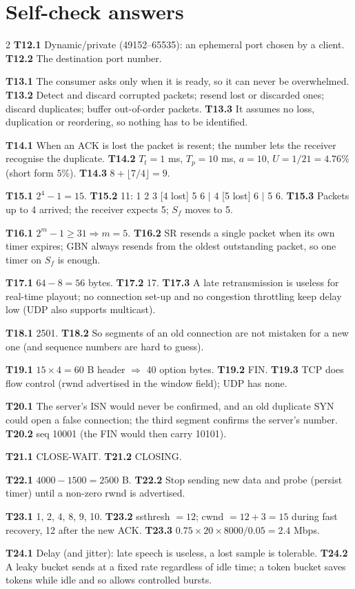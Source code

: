 \section*{Self-check answers}
\begin{multicols}{2}\footnotesize
\textbf{T12.1} Dynamic/private (49152--65535): an ephemeral port chosen by a client. \textbf{T12.2} The destination port number.

\textbf{T13.1} The consumer asks only when it is ready, so it can never be overwhelmed. \textbf{T13.2} Detect and discard corrupted packets; resend lost or discarded ones; discard duplicates; buffer out-of-order packets. \textbf{T13.3} It assumes no loss, duplication or reordering, so nothing has to be identified.

\textbf{T14.1} When an ACK is lost the packet is resent; the number lets the receiver recognise the duplicate. \textbf{T14.2} $T_t=1$ ms, $T_p=10$ ms, $a=10$, $U=1/21=4.76\%$ (short form 5\%). \textbf{T14.3} $8+\lfloor7/4\rfloor=9$.

\textbf{T15.1} $2^4-1=15$. \textbf{T15.2} 11: 1 2 3 [4 lost] 5 6 $|$ 4 [5 lost] 6 $|$ 5 6. \textbf{T15.3} Packets up to 4 arrived; the receiver expects 5; $S_f$ moves to 5.

\textbf{T16.1} $2^m-1\ge31\Rightarrow m=5$. \textbf{T16.2} SR resends a single packet when its own timer expires; GBN always resends from the oldest outstanding packet, so one timer on $S_f$ is enough.

\textbf{T17.1} $64-8=56$ bytes. \textbf{T17.2} 17. \textbf{T17.3} A late retransmission is useless for real-time playout; no connection set-up and no congestion throttling keep delay low (UDP also supports multicast).

\textbf{T18.1} 2501. \textbf{T18.2} So segments of an old connection are not mistaken for a new one (and sequence numbers are hard to guess).

\textbf{T19.1} $15\times4=60$ B header $\Rightarrow$ 40 option bytes. \textbf{T19.2} FIN. \textbf{T19.3} TCP does flow control (rwnd advertised in the window field); UDP has none.

\textbf{T20.1} The server's ISN would never be confirmed, and an old duplicate SYN could open a false connection; the third segment confirms the server's number. \textbf{T20.2} seq 10001 (the FIN would then carry 10101).

\textbf{T21.1} CLOSE-WAIT. \textbf{T21.2} CLOSING.

\textbf{T22.1} $4000-1500=2500$ B. \textbf{T22.2} Stop sending new data and probe (persist timer) until a non-zero rwnd is advertised.

\textbf{T23.1} 1, 2, 4, 8, 9, 10. \textbf{T23.2} ssthresh $=12$; cwnd $=12+3=15$ during fast recovery, 12 after the new ACK. \textbf{T23.3} $0.75\times20\times8000/0.05=2.4$ Mbps.

\textbf{T24.1} Delay (and jitter): late speech is useless, a lost sample is tolerable. \textbf{T24.2} A leaky bucket sends at a fixed rate regardless of idle time; a token bucket saves tokens while idle and so allows controlled bursts.
\end{multicols}
